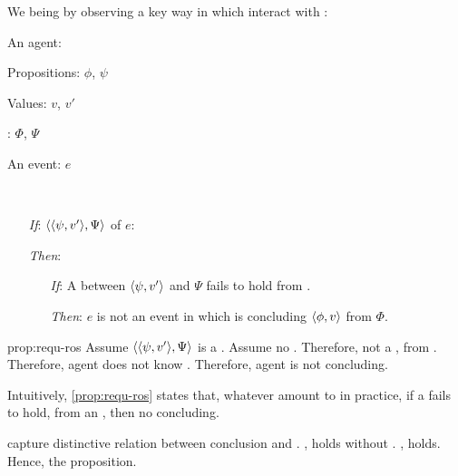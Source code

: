 \begin{note}
  We being by observing a key way in which  interact with :

  \begin{proposition}
    \label{prop:requ-ros}
    \begin{itemize*}[noitemsep, label=\(\circ\)]
    \item
      An agent: \vAgent{}
    \item
      Propositions: \(\phi\), \(\psi\)
    \item
      Values: \(v\), \(v'\)
    \item
      : \(\Phi\), \(\Psi\)
    \item
      An event: \(e\)
    \item
      \mbox{ }
    \end{itemize*}

    \begin{itemize}
    \item[\emph{If}:]
      \(\langle \langle \psi, v' \rangle, \Psi \rangle\) \requ{} of \(e\):
    \item[\emph{Then}:]
      \begin{itemize}
      \item[\emph{If}:]
        A \ros{} between \(\langle \psi, v' \rangle\) and \(\Psi\) fails to hold from .
      \item[\emph{Then}:]
        \(e\) is not an event in which \vAgent{} is concluding \(\langle \phi, v \rangle\) from \(\Phi\).
      \end{itemize}
    \end{itemize}
    \vspace{-\baselineskip}
  \end{proposition}

  \begin{argument}{prop:requ-ros}
    Assume \(\langle \langle \psi, v' \rangle, \Psi \rangle\) is a \requ{}. Assume no \ros{}.
    Therefore, not a \fc{}, from \agpe{}.
    Therefore, agent does not know \fc{}. Therefore, agent is not concluding.
  \end{argument}
\end{note}

\begin{note}
  Intuitively, \autoref{prop:requ-ros} states that, whatever  amount to in practice, if a \ros{} fails to hold, from an \agpe{}, then no concluding.

  \ros{} capture distinctive relation between conclusion and \poP{}.
  \supportII{}, holds without \wit{}.
  \fc{}, holds.
  Hence, the proposition.
\end{note}

